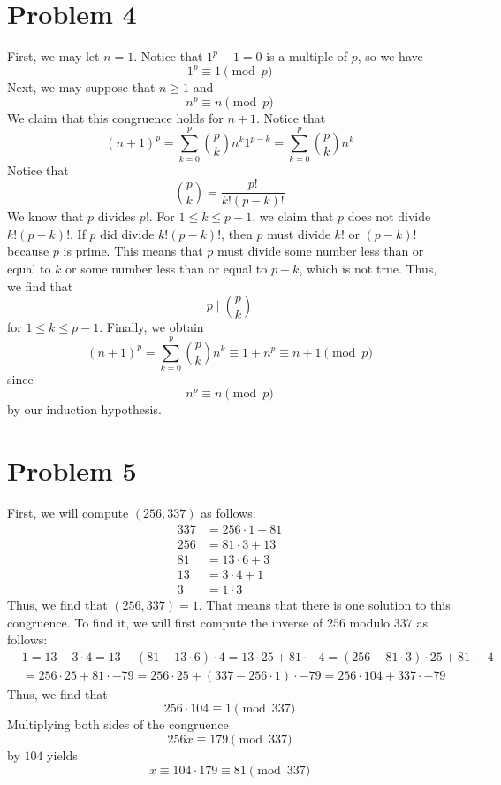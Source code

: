 \documentclass[12pt]{article}
\begin{document}
\section*{Problem 4}
First, we may let $n = 1$. Notice that $1^p - 1 = 0$ is a multiple of $p$, so we have
\[
1^p \equiv 1 \pmod{p}
\] Next, we may suppose that $n \geq 1$ and
\[
n^p \equiv n \pmod{p}
\] We claim that this congruence holds for $n+1$. Notice that
\[
(n+1)^p = \sum_{k=0}^p \binom{p}{k} n^k 1^{p-k} = \sum_{k=0}^p \binom{p}{k} n^k
\] Notice that
\[
\binom{p}{k} = \frac{p!}{k! (p-k)!}
\] We know that $p$ divides $p!$. For $1 \leq k \leq p - 1$, we claim that $p$ does not divide $k!(p-k)!$. If $p$ did divide $k!(p-k)!$, then $p$ must divide $k!$ or $(p-k)!$ because $p$ is prime. This means that $p$ must divide some number less than or equal to $k$ or some number less than or equal to $p-k$, which is not true. Thus, we find that
\[
p \mid \binom{p}{k}
\] for $1 \leq k \leq p - 1$. Finally, we obtain
\[
(n+1)^p = \sum_{k=0}^p \binom{p}{k} n^k \equiv 1 + n^p \equiv n + 1 \pmod{p}
\] since
\[
n^p \equiv n \pmod{p}
\] by our induction hypothesis.
\newpage
\section*{Problem 5}
First, we will compute $(256,337)$ as follows:
\begin{align*}
337 & = 256 \cdot 1 + 81 \\
256 & = 81 \cdot 3 + 13 \\
81 &= 13 \cdot 6 + 3\\
13 &= 3 \cdot 4 + 1 \\
3 & = 1 \cdot 3
\end{align*} Thus, we find that $(256,337) = 1$. That means that there is one solution to this congruence. To find it, we will first compute the inverse of $256$ modulo $337$ as follows:
\begin{align*}
& 1 = 13 - 3 \cdot 4 = 13 - (81 - 13 \cdot 6) \cdot 4 = 13 \cdot 25 + 81 \cdot -4 = (256 - 81 \cdot 3) \cdot 25 + 81 \cdot -4\\
& = 256 \cdot 25 + 81 \cdot -79 = 256 \cdot 25 + (337 - 256 \cdot 1) \cdot -79 = 256 \cdot 104 + 337 \cdot -79
\end{align*} Thus, we find that
\[
256 \cdot 104 \equiv 1 \pmod{337}
\] Multiplying both sides of the congruence 
\[
256x \equiv 179 \pmod{337}
\] by $104$ yields
\[
x \equiv 104 \cdot 179 \equiv 81 \pmod{337}
\]
\newpage
\end{document}
